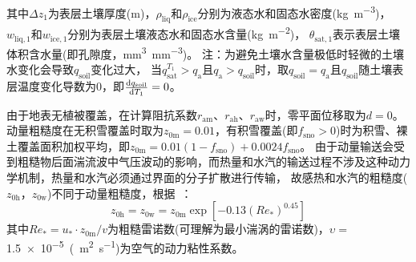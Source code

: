 其中$\Delta z_{1}$为表层土壤厚度(m)，$\rho_{\mathrm{liq}}$和$\rho_{\mathrm{ice}}$分别为液态水和固态水密度(\unit{kg.m^{-3}})，
$w_{\mathrm{liq,1}}$和$w_{\mathrm{ice,1}}$分别为表层土壤液态水和固态水含量(\unit{kg.m^{-2}})，
$\theta_{\mathrm{sat,1}}$表示表层土壤体积含水量(即孔隙度，\unit{mm^3.mm^{-3}})。
注：为避免土壤水含量极低时轻微的土壤水变化会导致$q_{\mathrm{soil}}$变化过大，
当$q_{\mathrm{sat}}^{T_1}>q_{\mathrm{a}}$且$q_{\mathrm{a}}>q_{\mathrm{soil}}$时，取$q_{\mathrm{soil}} = q_{\mathrm{a}}$且$q_{\mathrm{soil}}$随土壤表层温度变化导数为0，即$\frac{{\rm d}q_{\mathrm{soil}}}{{\rm d}T_1} = 0$。


由于地表无植被覆盖，在计算阻抗系数$r_{\mathrm{am}}$、$r_{\mathrm{ah}}$、$r_{\mathrm{aw}}$时，零平面位移取为$d=0$。动量粗糙度在无积雪覆盖时取为$z_{\mathrm{0m}}=0.01$，有积雪覆盖(即$f_{\mathrm{sno}}>0$)时为积雪、裸土覆盖面积加权平均，即$z_{\mathrm{0m}}=0.01\left( 1-f_{\mathrm{sno}} \right )+ 0.0024 f_{\mathrm{sno}}$。
由于动量输送会受到粗糙物后面湍流波中气压波动的影响，而热量和水汽的输送过程不涉及这种动力学机制，热量和水汽必须通过界面的分子扩散进行传输，
故感热和水汽的粗糙度($z_{\mathrm{0h}}$，$z_{\mathrm{0w}}$)不同于动量粗糙度，根据~\citet{zeng1998effect}：
\begin{equation}\label{z0hw}
  z_{\mathrm{0 h}} = z_{\mathrm{0 w}} = z_{\mathrm{0 m}} \exp \left[-0.13\left(Re_{*}\right)^{0.45}\right]
\end{equation}
其中$Re_{*} = u_{*} \cdot z_{\mathrm{0 m}} / v$为粗糙雷诺数(可理解为最小湍涡的雷诺数)，$\upsilon=$ \qty{1.5e-5}{(m^2.s^{-1}})为空气的动力粘性系数。


